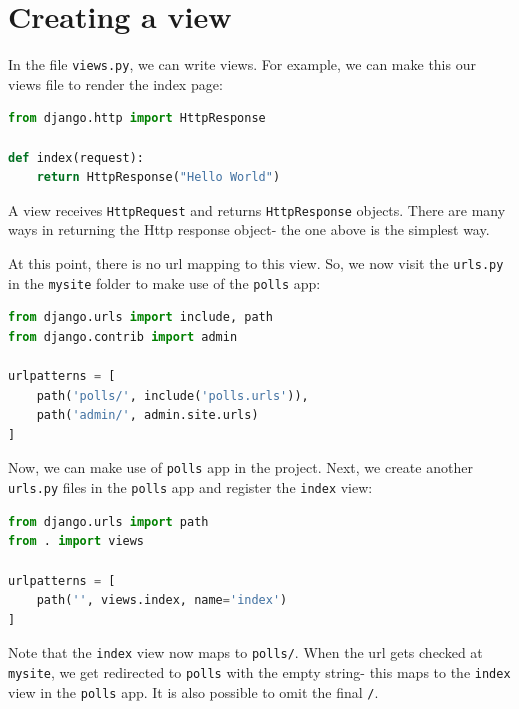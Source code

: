\documentclass[a4paper, openany]{memoir}
\begin{document}
    \section{Creating a view}
    In the file \texttt{views.py}, we can write views. For example, we can make this our views file to render the index page:
\begin{lstlisting}[language=python]
from django.http import HttpResponse

def index(request):
    return HttpResponse("Hello World")
\end{lstlisting}
    A view receives \texttt{HttpRequest} and returns \texttt{HttpResponse} objects. There are many ways in returning the Http response object- the one above is the simplest way.

    \noindent At this point, there is no url mapping to this view. So, we now visit the \texttt{urls.py} in the \texttt{mysite} folder to make use of the \texttt{polls} app:
\begin{lstlisting}[language=python]
from django.urls import include, path
from django.contrib import admin

urlpatterns = [
    path('polls/', include('polls.urls')),
    path('admin/', admin.site.urls)
]
\end{lstlisting}
Now, we can make use of \texttt{polls} app in the project. Next, we create another \texttt{urls.py} files in the \texttt{polls} app and register the \texttt{index} view:
\begin{lstlisting}[language=python]
from django.urls import path
from . import views

urlpatterns = [
    path('', views.index, name='index')
]
\end{lstlisting}
    Note that the \texttt{index} view now maps to \texttt{polls/}. When the url gets checked at \texttt{mysite}, we get redirected to \texttt{polls} with the empty string- this maps to the \texttt{index} view in the \texttt{polls} app. It is also possible to omit the final \texttt{/}. 
\end{document}
